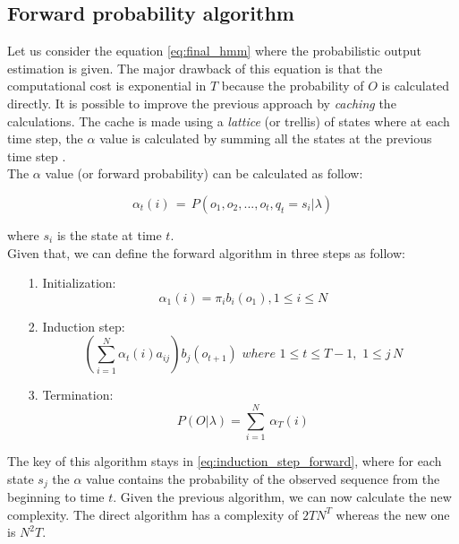 \subsection{Forward probability algorithm}
Let us consider the equation \ref{eq:final_hmm} where the probabilistic output estimation is given. The major drawback of this equation is that the computational cost is exponential in $T$ because the probability of $O$ is calculated directly. It is possible to improve the previous approach by \textit{caching} the calculations. The cache is made using a \textit{lattice} (or trellis) of states where at each time step, the $\alpha$ value is calculated by summing all the states at the previous time step \cite{hmm_tutorial}. \\

\noindent The $\alpha$ value (or forward probability) can be calculated as follow:

\begin{equation}
\label{eq:alpha_equation}
	\alpha_{t}(i) \, = \, P(o_{1}, o_{2}, ... , o_{t}, q_{t} = s_{i} | \lambda)
\end{equation}

\noindent where $s_{i}$ is the state at time $t$. \\
Given that, we can define the forward algorithm in three steps as follow:

\begin{itemize}
	\item[1.]{Initialization:} \\
		\begin{equation}
			\alpha_{1}(i) = \pi_{i}b_{i}(o_{1}), 1 \leq i \leq N
		\end{equation}
	\item[2.]{Induction step:} \\
		\begin{equation}
		\label{eq:induction_step_forward}
			\left ( \sum_{i=1}^{N} \alpha_{t}(i) a_{ij} \right ) b_{j}(o_{t+1}) \,\, where \,\, 1 \leq t \leq T - 1, \,\, 1 \leq j \, N
		\end{equation}
	\item[3.]{Termination:} \\
		\begin{equation}
			P(O|\lambda) = \sum_{i=1}^{N} \, \alpha_{T}(i)
		\end{equation}
\end{itemize}

\noindent The key of this algorithm stays in \ref{eq:induction_step_forward}, where for each state $s_{j}$ the $\alpha$ value contains the probability of the observed sequence from the beginning to time $t$. Given the previous algorithm, we can now calculate the new complexity. The direct algorithm has a complexity of $2TN^{T}$ whereas the new one is $N^{2}T$.

